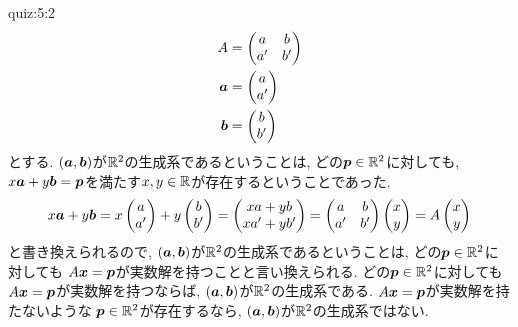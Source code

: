 \begin{answerof}{quiz:5:2}
  \begin{align*}
    A&=\begin{pmatrix}a&b\\a'&b'\end{pmatrix}\\
    \boldsymbol{a}&=\begin{pmatrix}a\\a'\end{pmatrix}\\
    \boldsymbol{b}&=\begin{pmatrix}b\\b'\end{pmatrix}
  \end{align*}
  とする.
  $(\boldsymbol{a},\boldsymbol{b})$が$\mathbb{R}^2$の生成系であるということは,
  どの$\boldsymbol{p}\in\mathbb{R}^2$に対しても,
  $x\boldsymbol{a}+y\boldsymbol{b}=\boldsymbol{p}$を満たす$x,y\in\mathbb{R}$が存在するということであった.
  \begin{align*}
    x\boldsymbol{a}+y\boldsymbol{b}=
    x\begin{pmatrix}a\\a'\end{pmatrix}+y\begin{pmatrix}b\\b'\end{pmatrix}
    =\begin{pmatrix}xa+yb\\xa'+yb'\end{pmatrix}
    =\begin{pmatrix}a&b\\a'&b'\end{pmatrix}\begin{pmatrix}x\\y\end{pmatrix}
    =A\begin{pmatrix}x\\y\end{pmatrix}
  \end{align*}
  と書き換えられるので,
  $(\boldsymbol{a},\boldsymbol{b})$が$\mathbb{R}^2$の生成系であるということは,
  どの$\boldsymbol{p}\in\mathbb{R}^2$に対しても
  $A\boldsymbol{x}=\boldsymbol{p}$が実数解を持つことと言い換えられる.
  どの$\boldsymbol{p}\in\mathbb{R}^2$に対しても
  $A\boldsymbol{x}=\boldsymbol{p}$が実数解を持つならば,
  $(\boldsymbol{a},\boldsymbol{b})$が$\mathbb{R}^2$の生成系である. 
  $A\boldsymbol{x}=\boldsymbol{p}$が実数解を持たないような
  $\boldsymbol{p}\in\mathbb{R}^2$が存在するなら,
  $(\boldsymbol{a},\boldsymbol{b})$が$\mathbb{R}^2$の生成系ではない.
 


\end{answerof}
